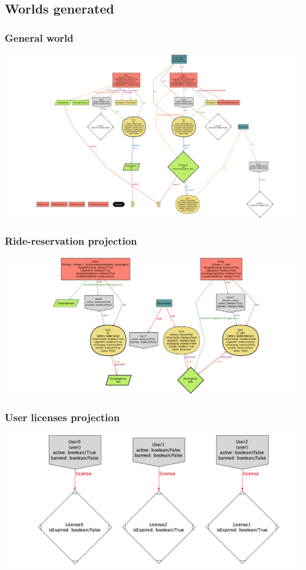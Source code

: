 	\begin{landscape}
	
	\subsection{Worlds generated}
	
		\subsubsection{General world}
			\includegraphics[height=\textheight, center]{img/world1.png}
	
		\subsubsection{Ride-reservation projection}
			\includegraphics[width=2\textwidth, center]{img/rides_reservations.png}
	
		\subsubsection{User licenses projection}
			\includegraphics[width=2\textwidth, center]{img/user_licenses.png}
		

\end{landscape}
